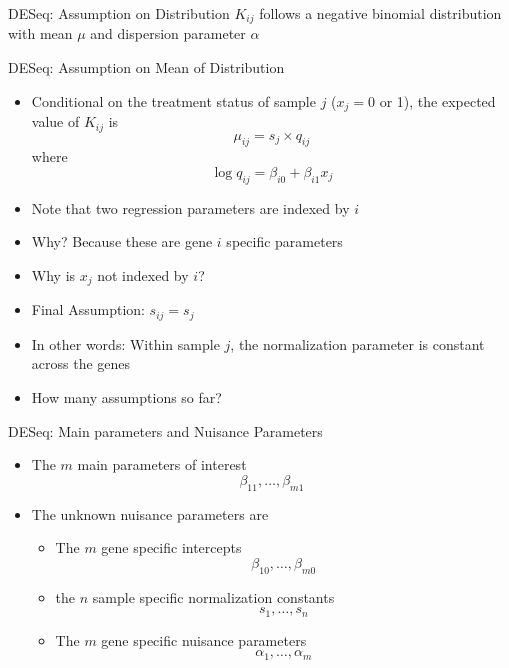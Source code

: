 \documentclass[xcolor=x11names,compress]{beamer}\usepackage[]{graphicx}\usepackage[]{color}
\begin{document}
\begin{frame}{DESeq: Assumption on Distribution}
  $K_{ij}$ follows a negative binomial distribution with mean $\mu$ and dispersion parameter $\alpha$
\end{frame}

\begin{frame}{DESeq: Assumption on Mean of Distribution}
  \begin{itemize}
  \item Conditional on the treatment status of sample $j$ ($x_j=0$ or 1), the expected value of $K_{ij}$ is
    \begin{equation*}
      \mu_{ij} = s_{j} \times q_{ij}
    \end{equation*}
 where
    \begin{equation*}
     \log q_{ij} = \beta_{i0} + \beta_{i1} x_j
    \end{equation*}
  \item Note that two regression parameters are indexed by $i$
  \item Why? Because these are gene $i$ specific parameters
  \item Why is $x_j$ not indexed by $i$?
  \item Final Assumption: $s_{ij}=s_j$
  \item In other words: Within sample $j$, the normalization parameter is constant across the genes
  \item How many assumptions so far?
  \end{itemize}
\end{frame}

\begin{frame}{DESeq: Main parameters and Nuisance Parameters}
  \begin{itemize}
    \item The $m$ main parameters of interest
      \begin{equation*}
        \beta_{11},\ldots,\beta_{m1}
      \end{equation*}
  \item The unknown nuisance parameters are
    \begin{itemize}
      \item The $m$ gene specific intercepts
        \begin{equation*}
          \beta_{10},\ldots,\beta_{m0}
        \end{equation*}
      \item the $n$ sample specific normalization constants
        \begin{equation*}
          s_1,\ldots,s_n
        \end{equation*}
      \item The $m$ gene specific nuisance parameters
         \begin{equation*}
          \alpha_{1},\ldots,\alpha_{m}
        \end{equation*}
       \end{itemize}
  \end{itemize}
\end{frame}
\end{document}
